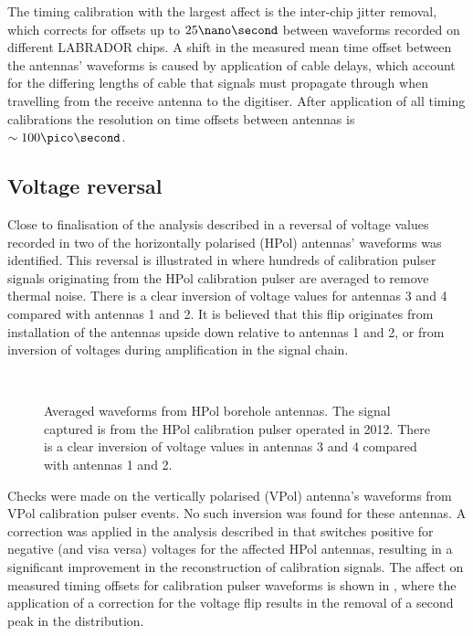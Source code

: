 The timing calibration with the largest affect is the inter-chip jitter removal, which corrects for offsets up to $25 \nano \second$ between waveforms recorded on different LABRADOR chips. A shift in the measured mean time offset between the antennas' waveforms is caused by application of cable delays, which account for the differing lengths of cable that signals must propagate through when travelling from the receive antenna to the digitiser. After application of all timing calibrations the resolution on time offsets between antennas is $\sim 100 \pico \second$.


\subsection{Voltage reversal}
\label{sec:calibration:Voltage-reversal}

Close to finalisation of the analysis described in  a reversal of voltage values recorded in two of the horizontally polarised (HPol) antennas' waveforms was identified. This reversal is illustrated in  where hundreds of calibration pulser signals originating from the HPol calibration pulser are averaged to remove thermal noise. There is a clear inversion of voltage values for antennas 3 and 4 compared with antennas 1 and 2. It is believed that this flip originates from installation of the antennas upside down relative to antennas 1 and 2, or from inversion of voltages during amplification in the signal chain. 

\begin{figure}[htpb]
  \hfill
  \\
  \hfill
\caption{Averaged waveforms from HPol borehole antennas. The signal captured is from the HPol calibration pulser operated in 2012. There is a clear inversion of voltage values in antennas 3 and 4 compared with antennas 1 and 2.}
\label{fig:calibration:Voltage-Reversal}
\end{figure}


Checks were made on the vertically polarised (VPol) antenna's waveforms from VPol calibration pulser events. No such inversion was found for these antennas. A correction was applied in the analysis described in  that switches positive for negative (and visa versa) voltages for the affected HPol antennas, resulting in a significant improvement in the reconstruction of calibration signals. The affect on measured timing offsets for calibration pulser waveforms is shown in , where the application of a correction for the voltage flip results in the removal of a second peak in the distribution.

